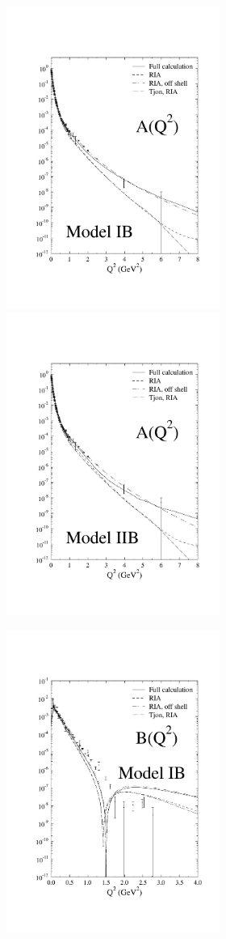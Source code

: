 \documentclass[mythesis.tex]{subfiles}
\begin{document}
\begin{figure}
     \centerline{\includegraphics[width=2.75in]{graphics/a_ib.pdf}
     \includegraphics[width=2.75in]{graphics/a_iib.pdf}}
\vspace{-24pt}
      \centerline{\includegraphics[width=2.75in]{graphics/b_ib.pdf}
}
\end{figure}
\end{document}
